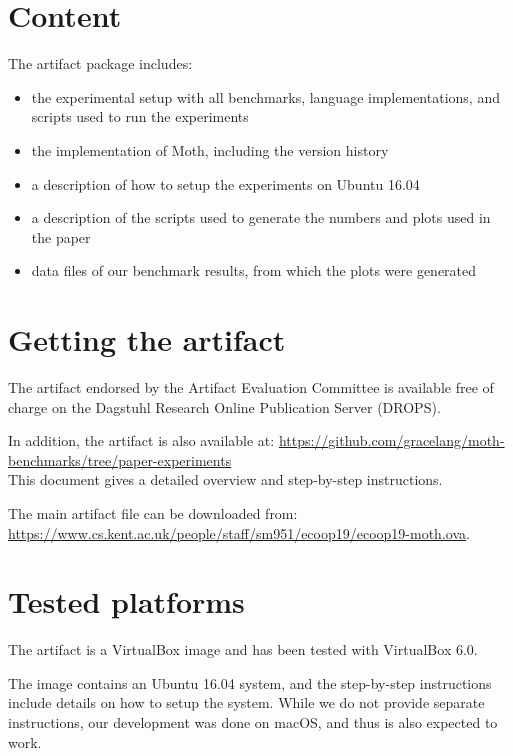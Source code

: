 \documentclass[a4paper,USenglish]{darts-v2019}
\newenvironment{content}{\section{Content}}{}
\newenvironment{getting}{\section{Getting the artifact} The artifact
endorsed by the Artifact Evaluation Committee is available free of
charge on the Dagstuhl Research Online Publication Server (DROPS).}{}
\newenvironment{platforms}{\section{Tested platforms}}{}
\begin{document}
\begin{content}
The artifact package includes:
\begin{itemize}
  \item the experimental setup with all benchmarks, language implementations, and scripts used to run the experiments
  \item the implementation of Moth, including the version history
  \item a description of how to setup the experiments on Ubuntu 16.04
  \item a description of the scripts used to generate the numbers and plots used in the paper
  \item data files of our benchmark results, from which the plots were generated
\end{itemize}
\end{content}

\begin{getting}
\label{sec:getting}

In addition, the artifact is also available at:
\url{https://github.com/gracelang/moth-benchmarks/tree/paper-experiments}\\
This document gives a detailed overview and step-by-step instructions.

The main artifact file can be downloaded from:\\
\url{https://www.cs.kent.ac.uk/people/staff/sm951/ecoop19/ecoop19-moth.ova}.
\end{getting}

\begin{platforms}
The artifact is a VirtualBox image and has been tested with VirtualBox 6.0.

The image contains an Ubuntu 16.04 system, and the step-by-step instructions
include details on how to setup the system.
While we do not provide separate instructions, our development was done on macOS,
and thus is also expected to work.
\end{platforms}
\end{document}

